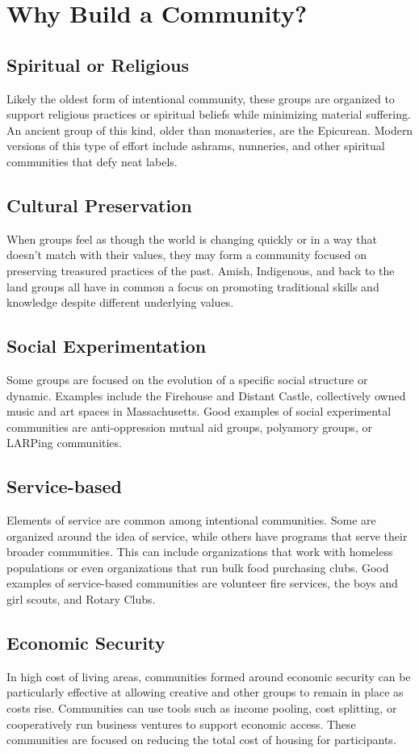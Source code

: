 \section{Why Build a Community?}
\subsection{Spiritual or Religious}
Likely the oldest form of intentional community, these groups are organized to support religious practices or spiritual beliefs while minimizing material suffering. An ancient group of this kind, older than monasteries, are the Epicurean. Modern versions of this type of effort include ashrams, nunneries, and other spiritual communities that defy neat labels.
\subsection{Cultural Preservation}
When groups feel as though the world is changing quickly or in a way that doesn't match with their values, they may form a community focused on preserving treasured practices of the past. Amish, Indigenous, and back to the land groups all have in common a focus on promoting traditional skills and knowledge despite different underlying values. 
\subsection{Social Experimentation}
Some groups are focused on the evolution of a specific social structure or dynamic. Examples include the Firehouse and Distant Castle, collectively owned music and art spaces in Massachusetts. Good examples of social experimental communities are anti-oppression mutual aid groups, polyamory groups, or LARPing communities. 
\subsection{Service-based}
Elements of service are common among intentional communities. Some are organized around the idea of service, while others have programs that serve their broader communities. This can include organizations that work with homeless populations or even organizations that run bulk food purchasing clubs. Good examples of service-based communities are volunteer fire services, the boys and girl scouts, and Rotary Clubs. 
\subsection{Economic Security}
In high cost of living areas, communities formed around economic security can be particularly effective at allowing creative and other groups to remain in place as costs rise. Communities can use tools such as income pooling, cost splitting, or cooperatively run business ventures to support economic access. These communities are focused on reducing the total cost of housing for participants. 

